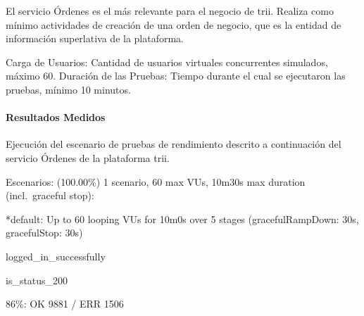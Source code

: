 \documentclass[
  paper=a4,
  ,captions=tableheading
]{scrartcl}
\renewenvironment{quote}{\begin{customblockquote}\list{}{\rightmargin=0em\leftmargin=0em}%
\item\relax\color{blockquote-text}\ignorespaces}{\unskip\unskip\endlist\end{customblockquote}}
\begin{document}
El servicio Órdenes es el más relevante para el negocio de trii. Realiza
como mínimo actividades de creación de una orden de negocio, que es la
entidad de información superlativa de la plataforma.

Carga de Usuarios: Cantidad de usuarios virtuales concurrentes
simulados, máximo 60. Duración de las Pruebas: Tiempo durante el cual se
ejecutaron las pruebas, mínimo 10 minutos.

\paragraph{Resultados Medidos}\label{sec:resultados-medidos-2}

Ejecución del escenario de pruebas de rendimiento descrito a
continuación del servicio Órdenes de la plataforma trii.

\begin{quote}
Escenarios: (100.00\%) 1 scenario, 60 max VUs, 10m30s max duration
(incl.~graceful stop):

*default: Up to 60 looping VUs for 10m0s over 5 stages
(gracefulRampDown: 30s, gracefulStop: 30s)

logged\_in\_successfully

is\_status\_200

86\%: OK 9881 / ERR 1506
\end{quote}
\end{document}
